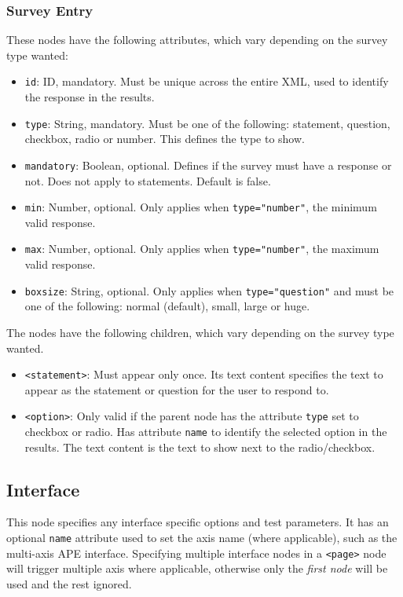 \documentclass[11pt, oneside]{article}   	%
\begin{document}
        \subsubsection{Survey Entry}
        These nodes have the following attributes, which vary depending on the survey type wanted:
        \begin{itemize}
            \item \texttt{id}: ID, mandatory. Must be unique across the entire XML, used to identify the response in the results.
            \item \texttt{type}: String, mandatory. Must be one of the following: statement, question, checkbox, radio or number. This defines the type to show.
            \item \texttt{mandatory}: Boolean, optional. Defines if the survey must have a response or not. Does not apply to statements. Default is false.
            \item \texttt{min}: Number, optional. Only applies when \texttt{type="number"}, the minimum valid response.
            \item \texttt{max}: Number, optional. Only applies when \texttt{type="number"}, the maximum valid response.
            \item \texttt{boxsize}: String, optional. Only applies when \texttt{type="question"} and must be one of the following: normal (default), small, large or huge.
        \end{itemize}

        The nodes have the following children, which vary depending on the survey type wanted.
        \begin{itemize}
            \item \texttt{<statement>}: Must appear only once. Its text content specifies the text to appear as the statement or question for the user to respond to.
            \item \texttt{<option>}: Only valid if the parent node has the attribute \texttt{type} set to checkbox or radio. Has attribute \texttt{name} to identify the selected option in the results. The text content is the text to show next to the radio/checkbox.
        \end{itemize}

    \subsection{Interface}
        This node specifies any interface specific options and test parameters. It has an optional \texttt{name} attribute used to set the axis name (where applicable), such as the multi-axis APE interface. Specifying multiple interface nodes in a \texttt{<page>} node will trigger multiple axis where applicable, otherwise only the \emph{first node} will be used and the rest ignored.
        
\end{document}
